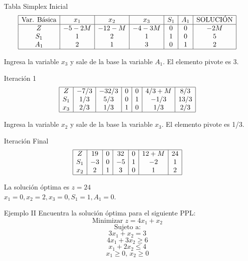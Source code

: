 \documentclass{beamer}
\begin{document}
\begin{frame}{Tabla Simplex Inicial}
    \[
    \begin{array}{|c|c|c|c|c|c|c|}
    \hline
    \text{Var. Básica} & x_1 & x_2 & x_3 & S_1 & A_1 & \text{SOLUCIÓN} \\
    \hline
    Z & -5 - 2M & -12 - M & -4 - 3M & 0 & 0 & -2M \\
    S_1 & 1 & 2 & 1 & 1 & 0 & 5 \\
    A_1 & 2 & 1 & 3 & 0 & 1 & 2 \\
    \hline
    \end{array}
    \]

    Ingresa la variable $x_3$ y sale de la base la variable $A_1$. El elemento pivote es 3.
\end{frame}

\begin{frame}{Iteración 1}
    \[
    \begin{array}{|c|c|c|c|c|c|c|}
    \hline
    Z & -7/3 & -32/3 & 0 & 0 & 4/3 + M & 8/3 \\
    S_1 & 1/3 & 5/3 & 0 & 1 & -1/3 & 13/3 \\
    x_3 & 2/3 & 1/3 & 1 & 0 & 1/3 & 2/3 \\
    \hline
    \end{array}
    \]

    Ingresa la variable $x_2$ y sale de la base la variable $x_3$. El elemento pivote es 1/3.
\end{frame}

\begin{frame}{Iteración Final}
    \[
    \begin{array}{|c|c|c|c|c|c|c|}
    \hline
    Z & 19 & 0 & 32 & 0 & 12 + M & 24 \\
    S_1 & -3 & 0 & -5 & 1 & -2 & 1 \\
    x_2 & 2 & 1 & 3 & 0 & 1 & 2 \\
    \hline
    \end{array}
    \]

    La solución óptima es $z = 24$\\
    $x_1= 0, x_2= 2, x_3= 0, S_1= 1, A_1= 0$.
\end{frame}

\begin{frame}{Ejemplo II}
    Encuentra la solución óptima para el siguiente PPL:
    \[
    \text{Minimizar } z = 4x_1 + x_2
    \]
    \[
    \text{Sujeto a:}
    \]
    \[
    3x_1 + x_2 = 3
    \]
    \[
    4x_1 + 3x_2 \geq 6
    \]
    \[
    x_1 + 2x_2 \leq 4
    \]
    \[
    x_1 \geq 0, \, x_2 \geq 0
    \]
\end{frame}
\end{document}
